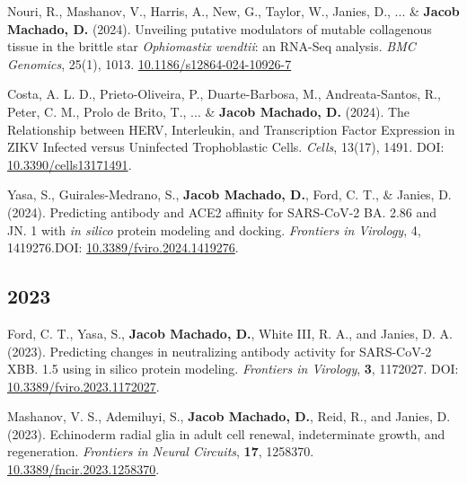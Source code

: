 \documentclass[11pt, letterpaper, sans]{moderncv}
\begin{document}
	{\setlength{\parskip}{.5em}\renewcommand{\baselinestretch}{2.0}\begin{hangparas}{.25in}{1}

		Nouri, R., Mashanov, V., Harris, A., New, G., Taylor, W., Janies, D., ... \& \textbf{Jacob Machado, D.} (2024). Unveiling putative modulators of mutable collagenous tissue in the brittle star \textit{Ophiomastix wendtii}: an RNA-Seq analysis. \textit{BMC Genomics}, 25(1), 1013. \href{https://doi.org/10.1186/s12864-024-10926-7}{10.1186/s12864-024-10926-7}

		Costa, A. L. D., Prieto-Oliveira, P., Duarte-Barbosa, M., Andreata-Santos, R., Peter, C. M., Prolo de Brito, T., ... \& \textbf{Jacob Machado, D.} (2024). The Relationship between HERV, Interleukin, and Transcription Factor Expression in ZIKV Infected versus Uninfected Trophoblastic Cells. \textit{Cells}, 13(17), 1491. DOI: \href{https://doi.org/10.3390/cells13171491}{10.3390/cells13171491}.

        Yasa, S., Guirales-Medrano, S., \textbf{Jacob Machado, D.}, Ford, C. T., \& Janies, D. (2024). Predicting antibody and ACE2 affinity for SARS-CoV-2 BA. 2.86 and JN. 1 with \textit{in silico} protein modeling and docking. \textit{Frontiers in Virology}, 4, 1419276.DOI: \href{https://doi.org/10.3389/fviro.2024.1419276}{10.3389/fviro.2024.1419276}.

	\end{hangparas}}


\subsection{2023}

	{\setlength{\parskip}{.5em}\renewcommand{\baselinestretch}{2.0}\begin{hangparas}{.25in}{1}

		Ford, C. T., Yasa, S., \textbf{Jacob Machado, D.}, White III, R. A., and Janies, D. A. (2023). Predicting changes in neutralizing antibody activity for SARS-CoV-2 XBB. 1.5 using in silico protein modeling. \textit{Frontiers in Virology}, \textbf{3}, 1172027. DOI: \href{https://doi.org/10.3389/fviro.2023.1172027}{10.3389/fviro.2023.1172027}.

		Mashanov, V. S., Ademiluyi, S., \textbf{Jacob Machado, D.}, Reid, R., and Janies, D. (2023). Echinoderm radial glia in adult cell renewal, indeterminate growth, and regeneration. \textit{Frontiers in Neural Circuits}, \textbf{17}, 1258370. \href{https://doi.org/10.3389/fncir.2023.1258370}{10.3389/fncir.2023.1258370}.

	\end{hangparas}}
\end{document}
